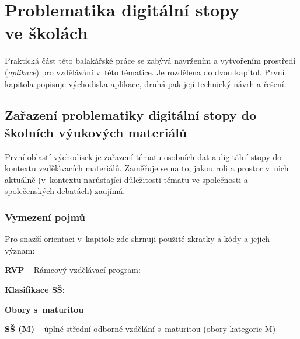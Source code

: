 \chapter{Problematika digitální stopy\\ ve školách}

Praktická část této balakářské práce se zabývá navržením a vytvořením prostředí (\textit{aplikace}) pro vzdělávání v~této tématice.
Je rozdělena do dvou kapitol. První kapitola popisuje východiska aplikace, druhá pak její technický návrh a řešení.

\section{Zařazení problematiky digitální stopy do školních výukových materiálů}

První oblastí východisek je zařazení tématu osobních dat a digitální stopy do kontextu vzdělávacích materiálů.
Zaměřuje se na to, jakou roli a prostor v~nich aktuálně (v~kontextu narůstající důležitosti tématu ve společnosti a společenských debatách) zaujímá.

\subsection*{Vymezení pojmů}

Pro snazší orientaci v~kapitole zde shrnuji použité zkratky a kódy a jejich význam:

\textbf{RVP} -- Rámcový vzdělávací program:

\begin{displayquote}
 \citep{rvp} 
\end{displayquote}

\textbf{Klasifikace SŠ}:

\textbf{Obory s~maturitou}

\textbf{SŠ (M)} -- úplné střední odborné vzdělání s~maturitou (obory kategorie M)

\begin{displayquote}
 \citep{stredni-vzdelavani}
\end{displayquote}


